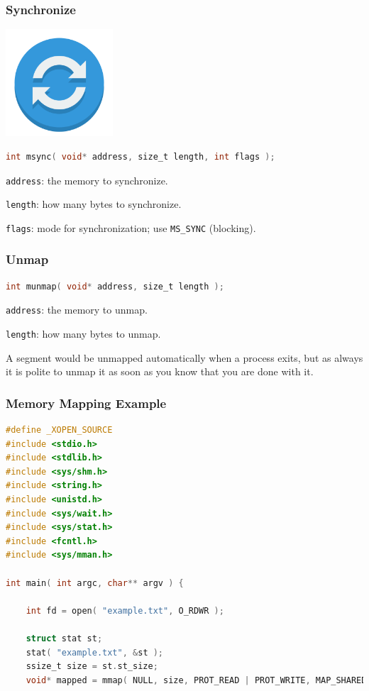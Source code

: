 \begin{frame}[fragile]
\frametitle{Synchronize}

\begin{center}
	\includegraphics[width=0.3\textwidth]{images/sync-icon.png}
\end{center}

\begin{lstlisting}[language=C]
int msync( void* address, size_t length, int flags );
\end{lstlisting}

\texttt{address}: the memory to synchronize.

\texttt{length}: how many bytes to synchronize.

\texttt{flags}: mode for synchronization; use \texttt{MS\_SYNC} (blocking).

\end{frame}


\begin{frame}[fragile]
\frametitle{Unmap}

\begin{lstlisting}[language=C]
int munmap( void* address, size_t length );
\end{lstlisting}

\texttt{address}: the memory to unmap.

\texttt{length}: how many bytes to unmap.

A segment would be unmapped automatically when a process exits, but as always it is polite to unmap it as soon as you know that you are done with it.

\end{frame}


\begin{frame}[fragile]
\frametitle{Memory Mapping Example}

\begin{lstlisting}[language=C]
#define _XOPEN_SOURCE
#include <stdio.h>
#include <stdlib.h>
#include <sys/shm.h>
#include <string.h>
#include <unistd.h>
#include <sys/wait.h>
#include <sys/stat.h>
#include <fcntl.h>
#include <sys/mman.h>

int main( int argc, char** argv ) { 

    int fd = open( "example.txt", O_RDWR );
    
    struct stat st; 
    stat( "example.txt", &st );
    ssize_t size = st.st_size;
    void* mapped = mmap( NULL, size, PROT_READ | PROT_WRITE, MAP_SHARED, fd, 0 );  
\end{lstlisting}
\end{frame}

